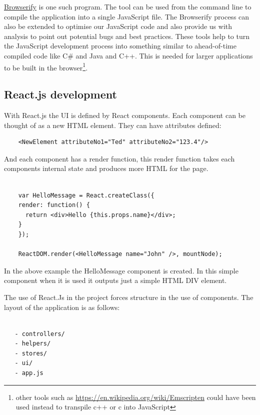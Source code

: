 \href{http://browserify.org/}{Browserify} is one such program. The tool can be
used from the command line to compile the application into a single JavaScript
file. The Browserify process can also be extended to optimise our JavaScript
code and also provide us with analysis to point out potential bugs and best
practices. These tools help to turn the JavaScript development process into
something similar to ahead-of-time compiled code like C\# and Java and C++. This
is needed for larger applications to be built in the browser\footnote{other
tools such as \url{https://en.wikipedia.org/wiki/Emscripten} could have been
used instead to transpile c++ or c into JavaScript }.

\subsection{React.js development}\label{react.js-development}

With React.js the UI is defined by React components. Each component can
be thought of as a new HTML element. They can have attributes defined:

\begin{listing}[ht]
  \begin{verbatim}
    <NewElement attributeNo1="Ted" attributeNo2="123.4"/>
  \end{verbatim}
\end{listing}

And each component has a render function, this render function takes
each components internal state and produces more HTML for the page.


\begin{verbatim}

    var HelloMessage = React.createClass({
    render: function() {
      return <div>Hello {this.props.name}</div>;
    }
    });

    ReactDOM.render(<HelloMessage name="John" />, mountNode);

\end{verbatim}

In the above example the HelloMessage component is created. In this
simple component when it is used it outputs just a simple HTML DIV
element.

The use of React.Js in the project forces structure in the use of
components. The layout of the application is as follows:

\begin{verbatim}

   - controllers/
   - helpers/ 
   - stores/ 
   - ui/ 
   - app.js

\end{verbatim}

